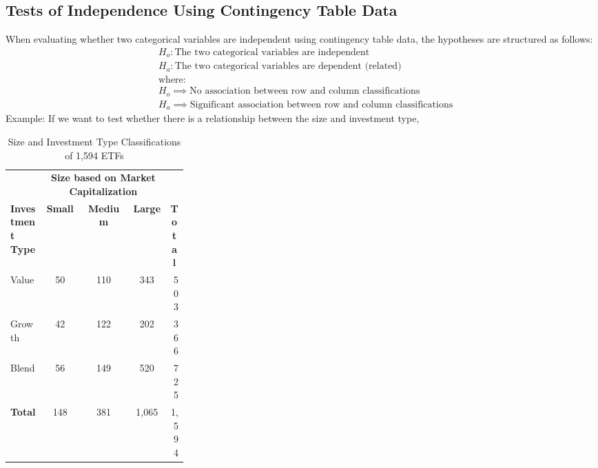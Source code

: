 \subsection{Tests of Independence Using Contingency Table Data}
\label{sub:Tests of Independence Using Contingency Table Data}
When evaluating whether two categorical variables are independent using contingency table data, the hypotheses are structured as follows:
\begin{align*}
	 & H_o: \text{The two categorical variables are independent}                 \\
	 & H_a: \text{The two categorical variables are dependent (related)}            \\
	 & \text{where:}                                                             \\
	 & H_o \implies \text{No association between row and column classifications} \\
	 & H_a \implies \text{Significant association between row and column classifications}
\end{align*}
Example: If we want to test whether there is a relationship between the size and investment type, 
\begin{table}[h!]
\centering
\caption{Size and Investment Type Classifications of 1,594 ETFs}
\label{tab:contingency-table}
\begin{tabular}{p{0.2\linewidth} rrr p{0.1\linewidth}}
 &
  \multicolumn{3}{c}{\textbf{Size based on Market Capitalization}} &
  \multicolumn{1}{c}{} \\ \cline{2-4}
\textbf{Investment Type} &
  \multicolumn{1}{c}{\textbf{Small}} &
  \multicolumn{1}{c}{\textbf{Medium}} &
  \multicolumn{1}{c}{\textbf{Large}} &
  \multicolumn{1}{c}{\textbf{Total}} \\ \hline
Value          & \multicolumn{1}{c}{50}  & \multicolumn{1}{c}{110} & \multicolumn{1}{c}{343}   & \multicolumn{1}{r}{503}   \\
Growth         & \multicolumn{1}{c}{42}  & \multicolumn{1}{c}{122} & \multicolumn{1}{c}{202}   & \multicolumn{1}{r}{366}   \\
Blend          & \multicolumn{1}{c}{56}  & \multicolumn{1}{c}{149} & \multicolumn{1}{c}{520}   & \multicolumn{1}{r}{725}   \\ \cline{2-5} 
\textbf{Total} & \multicolumn{1}{c}{148} & \multicolumn{1}{c}{381} & \multicolumn{1}{c}{1,065} & \multicolumn{1}{r}{1,594} \\ \hline
\end{tabular}
\end{table}
